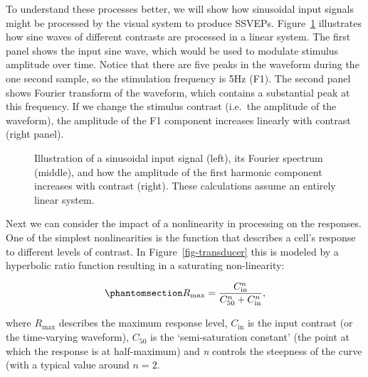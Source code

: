 \documentclass[
  letterpaper,
  DIV=11,
  numbers=noendperiod]{scrartcl}
\begin{document}
To understand these processes better, we will show how sinusoidal input
signals might be processed by the visual system to produce SSVEPs.
Figure~\ref{fig-linear} illustrates how sine waves of different
contrasts are processed in a linear system. The first panel shows the
input sine wave, which would be used to modulate stimulus amplitude over
time. Notice that there are five peaks in the waveform during the one
second sample, so the stimulation frequency is 5Hz (F1). The second
panel shows Fourier transform of the waveform, which contains a
substantial peak at this frequency. If we change the stimulus contrast
(i.e.~the amplitude of the waveform), the amplitude of the F1 component
increases linearly with contrast (right panel).

\begin{figure}


\caption{\label{fig-linear}Illustration of a sinusoidal input signal
(left), its Fourier spectrum (middle), and how the amplitude of the
first harmonic component increases with contrast (right). These
calculations assume an entirely linear system.}

\end{figure}%

Next we can consider the impact of a nonlinearity in processing on the
responses. One of the simplest nonlinearities is the function that
describes a cell's response to different levels of contrast. In
Figure~\ref{fig-transducer} this is modeled by a hyperbolic ratio
function resulting in a saturating non-linearity:

\begin{equation}\phantomsection\label{eq-nakarushton}{R_{\mathrm{max}} = \frac{C_{\mathrm{in}}^n}{C_{50}^n + C_{\mathrm{in}}^n},}\end{equation}

where \({R_{\mathrm{max}}}\) describes the maximum response level,
\(C_{\mathrm{in}}\) is the input contrast (or the time-varying
waveform), \(C_{50}\) is the `semi-saturation constant' (the point at
which the response is at half-maximum) and \emph{n} controls the
steepness of the curve (with a typical value around \(n=2\).
\end{document}
